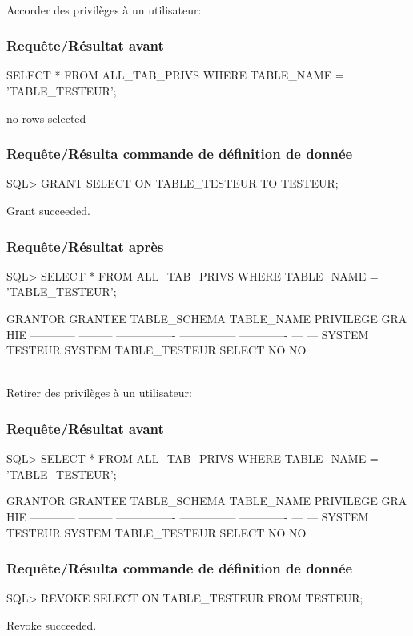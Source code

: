 \documentclass[•]{article}
\begin{document}
\textrm{ }
\\
\textrm{Accorder des privilèges à un utilisateur:}
\subsubsection{Requête/Résultat avant}
\begin{sql}
 SELECT * FROM ALL_TAB_PRIVS WHERE TABLE_NAME = 'TABLE_TESTEUR'; 
 
 no rows selected
\end{sql}
\subsubsection{Requête/Résulta commande de définition de donnée}
\begin{sql}
SQL> GRANT SELECT ON TABLE_TESTEUR TO TESTEUR;

Grant succeeded.
\end{sql}
\subsubsection{Requête/Résultat après}
\begin{sql}
SQL>   SELECT * FROM ALL_TAB_PRIVS WHERE TABLE_NAME = 'TABLE_TESTEUR';

GRANTOR      GRANTEE   TABLE_SCHEMA     TABLE_NAME      PRIVILEGE     GRA HIE
------------ --------- ---------------- --------------- ------------- --- ---
SYSTEM       TESTEUR   SYSTEM           TABLE_TESTEUR   SELECT        NO  NO


\end{sql}

\textrm{ }
\\
\textrm{Retirer des privilèges à un utilisateur:}
\subsubsection{Requête/Résultat avant}
\begin{sql}
SQL>   SELECT * FROM ALL_TAB_PRIVS WHERE TABLE_NAME = 'TABLE_TESTEUR';

GRANTOR      GRANTEE   TABLE_SCHEMA     TABLE_NAME      PRIVILEGE     GRA HIE
------------ --------- ---------------- --------------- ------------- --- ---
SYSTEM       TESTEUR   SYSTEM           TABLE_TESTEUR   SELECT        NO  NO

\end{sql}
\subsubsection{Requête/Résulta commande de définition de donnée}
\begin{sql}
SQL> REVOKE SELECT ON TABLE\_TESTEUR FROM TESTEUR;

Revoke succeeded.
\end{sql}
\end{document}
